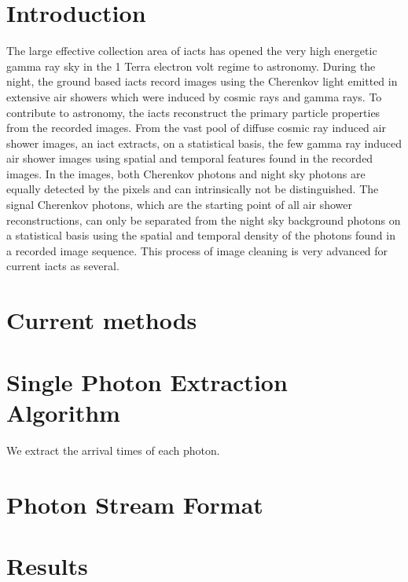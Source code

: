 \documentclass[review]{elsarticle}
\begin{document}
\section{Introduction}
%
The large effective collection area of \acfp{iact} has opened the very high energetic gamma ray sky in the 1 Terra electron volt regime to astronomy.
%
During the night, the ground based \acsp{iact} record images using the Cherenkov light emitted in extensive air showers which were induced by cosmic rays and gamma rays.
%
To contribute to astronomy, the \acsp{iact} reconstruct the primary particle properties from the recorded images.
%
From the vast pool of diffuse cosmic ray induced air shower images, an \acs{iact} extracts, on a statistical basis, the few gamma ray induced air shower images using spatial and temporal features found in the recorded images.
%
In the images, both Cherenkov photons and night sky photons are equally detected by the pixels and can intrinsically not be distinguished.
%
The signal Cherenkov photons, which are the starting point of all air shower reconstructions, can only be separated from the night sky background photons on a statistical basis using the spatial and temporal density of the photons found in a recorded image sequence.
%
This process of image cleaning is very advanced for current \acp{iact} as several.
%
\section{Current methods}

%
\section{Single Photon Extraction Algorithm}
\label{SecExtractor}
%
We extract the arrival times of each photon. 
%
\section{Photon Stream Format}
\label{SecPhotonStream}
\section{Results}
%
\end{document}
